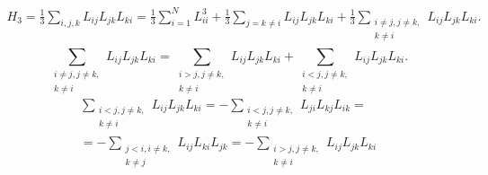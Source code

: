 \documentclass[a4paper]{article}
\begin{document}
\begin{hiProb}[Упражнение 1.2]
\end{hiProb}
\begin{sol}
\begin{multline*}
H_3= \frac{1}{3} \sum_{i,j,k}^{} L_{ij}L_{jk}L_{ki}=
\frac{1}{3}\sum_{i=1}^{N} L_{ii}^3+
\frac{1}{3}\sum_{j=k\neq i}^{} L_{ij}L_{jk}L_{ki}+
\frac{1}{3} \sum_{\substack{i\neq j, j\neq k,\\ k\neq i}}^{} L_{ij}L_{jk}L_{ki}
.\end{multline*} 
\[
\sum_{\substack{i\neq j, j\neq k,\\ k\neq i}}^{} L_{ij}L_{jk}L_{ki}=
\sum_{\substack{i>j, j\neq k,\\ k\neq i}}^{} L_{ij}L_{jk}L_{ki}+
\sum_{\substack{i<j, j\neq k,\\ k\neq i}}^{} L_{ij}L_{jk}L_{ki}
.\] 
\begin{multline*}
\sum_{\substack{i<j, j\neq k,\\ k\neq i}}^{} L_{ij}L_{jk}L_{ki}=-
\sum_{\substack{i<j, j\neq k,\\ k\neq i}}^{} L_{ji}L_{kj}L_{ik}=\\=-
\sum_{\substack{j<i, i\neq k,\\ k\neq j}}^{} L_{ij}L_{ki}L_{jk}=
-\sum_{\substack{i>j, j\neq k,\\ k\neq i}}^{} L_{ij}L_{jk}L_{ki}

\end{multline*}
\end{sol}
\end{document}
